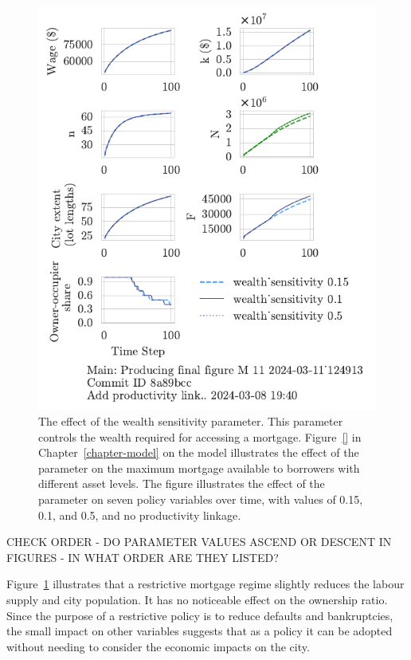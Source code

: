\begin{figure}[h!bt]
    \centering
    \includegraphics[scale=1, trim={0 1.4cm 0 0},clip]{fig/wealth_sensitivity-124913.pdf}
    \caption[The effect of the wealth sensitivity parameter]{The effect of the wealth sensitivity parameter. This parameter controls the wealth required for accessing a mortgage. {\color{red} Figure~\ref{} in Chapter~\ref{chapter-model} on the model illustrates the effect of the parameter on the maximum mortgage available to borrowers with different asset levels.} The figure illustrates the effect of the parameter on seven policy variables over time, with values of 0.15, 0.1, and 0.5, and no productivity linkage. }
    \label{fig:wealth_sensitivity_ownership_trajectory}
\end{figure}

{\color{red} CHECK ORDER - DO PARAMETER VALUES ASCEND OR DESCENT IN FIGURES - IN WHAT ORDER ARE THEY LISTED?}

Figure~\ref{fig:wealth_sensitivity_ownership_trajectory} illustrates that a restrictive mortgage regime slightly reduces the labour supply and city population. It has no noticeable effect on the ownership ratio. Since the purpose of a restrictive policy is to reduce defaults and bankruptcies, the small impact on other variables suggests that as a policy it can be adopted without needing to consider the economic impacts on the city. 

